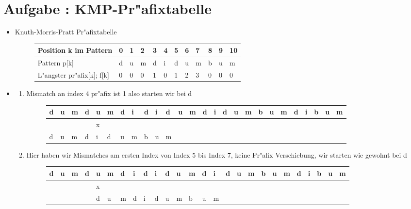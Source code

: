 \documentclass[12pt]{article}
\newcounter{exnum}
\newcommand{\aufgabe}[1]{\section*{Aufgabe \theexnum\stepcounter{exnum}: #1}} %
\begin{document}
\aufgabe{KMP-Pr"afixtabelle}

\begin{itemize}

\item 
Knuth-Morris-Pratt Pr"afixtabelle
\begin{figure}[h]
\begin{tabular}{|l|l|l|l|l|l|l|l|l|l|l|l|}
\hline
Position k im Pattern            & 0 & 1 & 2 & 3 & 4 & 5 & 6 & 7 & 8 & 9 & 10 \\ \hline
Pattern p{[}k{]}                 & d & u & m & d & i & d & u & m & b & u & m  \\ \hline
L"angster pr"afix{[}k{]}; f{[}k{]} & 0 & 0 & 0 & 1 & 0 & 1 & 2 & 3 & 0 & 0 & 0  \\ \hline
\end{tabular}
\end{figure}

\item 
\begin{enumerate}
\item
Mismatch an index 4 \newline pr"afix ist 1 also starten wir bei d
\begin{figure}[h]
\begin{tabular}{llllllllllllllllllllllllll}
\hline
d & u & m & d & u & m & d & i & d & i & d & u & m & d & i & d & u & m & b & u & m & d & i & b & u & m \\ \hline
  &   &   &   & x &   &   &   &   &   &   &   &   &   &   &   &   &   &   &   &   &   &   &   &   &   \\
d & u & m & d & i & d & u & m & b & u & m &   &   &   &   &   &   &   &   &   &   &   &   &   &   &   \\ \hline
\end{tabular}
\end{figure}
\item
Hier haben wir Mismatches am ersten Index von Index 5 bis Index 7, keine Pr"afix Verschiebung, wir starten wie gewohnt bei d
\begin{figure}[h]
\begin{tabular}{llllllllllllllllllllllllll}
\hline
d & u & m & d & u & m & d & i & d & i & d & u & m & d & i & d & u & m & b & u & m & d & i & b & u & m \\ \hline
  &   &   &   & x &   &   &   &   &   &   &   &   &   &   &   &   &   &   &   &   &   &   &   &   &   \\
  &   &   &   & d & u & m & d & i & d & u & m & b & u & m &   &   &   &   &   &   &   &   &   &   &   \\ \hline
\end{tabular}


\end{figure}
\end{enumerate}
\end{itemize}
\end{document}
